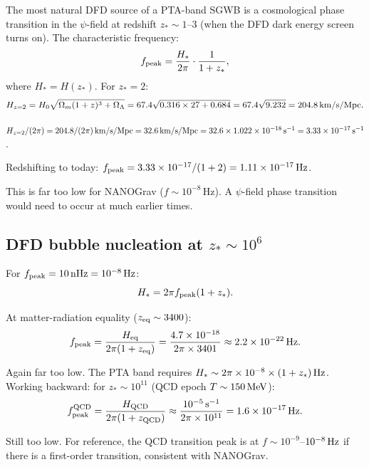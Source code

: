 \documentclass[11pt]{article}
\newcommand{\ee}[1]{\times 10^{#1}}
\begin{document}
The most natural DFD source of a PTA-band SGWB is a cosmological phase
transition in the $\psi$-field at redshift $z_* \sim 1$--$3$ (when
the DFD dark energy screen turns on).  The characteristic frequency:
\begin{equation}
  f_{\rm peak} = \frac{H_*}{2\pi}\cdot\frac{1}{1+z_*},
\end{equation}
where $H_* = H(z_*)$.  For $z_* = 2$:
\begin{equation}
  H_{z=2} = H_0\sqrt{\Omega_m(1+z)^3 + \Omega_\Lambda}
  = 67.4\sqrt{0.316\times 27 + 0.684} = 67.4\sqrt{9.232} = 204.8\,{\rm km/s/Mpc}.
\end{equation}

$H_{z=2}/(2\pi) = 204.8/(2\pi)\,{\rm km/s/Mpc} = 32.6\,{\rm km/s/Mpc}
= 32.6\times 1.022\ee{-18}\,{\rm s}^{-1} = 3.33\ee{-17}\,{\rm s}^{-1}$.

Redshifting to today: $f_{\rm peak} = 3.33\ee{-17}/(1+2) = 1.11\ee{-17}\,{\rm Hz}$.

This is far too low for NANOGrav ($f \sim 10^{-8}$\,Hz).  A $\psi$-field
phase transition would need to occur at much earlier times.

\subsection{DFD bubble nucleation at $z_* \sim 10^6$}

For $f_{\rm peak} = 10\,{\rm nHz} = 10^{-8}\,{\rm Hz}$:
\begin{equation}
  H_* = 2\pi f_{\rm peak}(1 + z_*).
\end{equation}

At matter-radiation equality ($z_{\rm eq} \sim 3400$):
\begin{equation}
  f_{\rm peak} = \frac{H_{\rm eq}}{2\pi(1+z_{\rm eq})}
  = \frac{4.7\ee{-18}}{2\pi\times 3401} \approx 2.2\ee{-22}\,{\rm Hz}.
\end{equation}

Again far too low.  The PTA band requires $H_* \sim 2\pi\times 10^{-8}
\times (1+z_*)\,{\rm Hz}$.  Working backward: for $z_* \sim 10^{11}$
(QCD epoch $T \sim 150\,{\rm MeV}$):
\begin{equation}
  f_{\rm peak}^{\rm QCD} = \frac{H_{\rm QCD}}{2\pi(1+z_{\rm QCD})}
  \approx \frac{10^{-5}\,{\rm s}^{-1}}{2\pi\times 10^{11}}
  = 1.6\ee{-17}\,{\rm Hz}.
\end{equation}

Still too low.  For reference, the QCD transition peak is at
$f \sim 10^{-9}$--$10^{-8}\,{\rm Hz}$ if there is a first-order
transition, consistent with NANOGrav.
\end{document}
